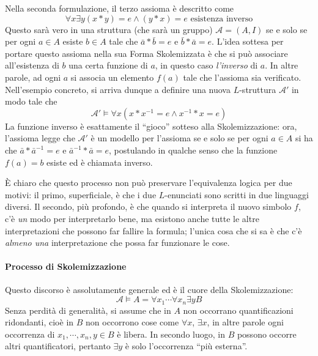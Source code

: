 Nella seconda formulazione, il terzo assioma è descritto come 
$$
\forall x \exists y (x * y) = e \land (y * x) = e \text{ esistenza inverso}
$$
Questo sarà vero in una struttura (che sarà un gruppo) $\mathcal{A} = (A,I)$ se e 
solo se per ogni $a \in A$ esiste $b \in A$ tale che $\bar{a} * \bar{b} = e$ 
e $\bar{b} * \bar{a} = e$. L'idea sottesa per portare questo assioma 
nella sua Forma Skolemizzata è che si può associare all'esistenza di $b$ una 
certa funzione di $a$, in questo caso \textit{l'inverso} di $a$. In altre 
parole, ad ogni $a$ si associa un elemento $f(a)$ tale che l'assioma sia verificato. 
Nell'esempio concreto, si arriva dunque a definire una nuova $L$-struttura $\mathcal{A}'$
in modo tale che 
$$
\mathcal{A}' \models \forall x (x*x^{-1} = e \land x^{-1} * x = e)
$$
La funzione inverso è esattamente il ``gioco'' sotteso alla Skolemizzazione: 
ora, l'assioma legge che $\mathcal{A}'$ è un modello per l'assioma 
se e solo se per ogni $a \in A$ si ha che $\bar{a} * \bar{a}^{-1} = e$ 
e $\bar{a}^{-1} * \bar{a} = e$, postulando in qualche senso che  la funzione
$f(a) = b$ esiste ed è chiamata inverso. 

\`E chiaro che questo processo non può preservare l'equivalenza logica per 
due motivi: il primo, superficiale, è che i due $L$-enunciati 
sono scritti in due linguaggi diversi. Il secondo, più profondo, è che 
quando si interpreta il nuovo simbolo $f$, c'è \textit{un} modo per interpretarlo 
bene, ma esistono anche tutte le altre interpretazioni che possono 
far fallire la formula; l'unica cosa che si sa è che c'è \textit{almeno una}
interpretazione che possa far funzionare le cose. 

\paragraph{Processo di Skolemizzazione}
Questo discorso è assolutamente generale ed è il cuore della Skolemizzazione: 
$$
\mathcal{A} \models A =  \forall x_1\cdots\forall x_n \exists y B
$$
Senza perdità di generalità, si assume che in $A$ non occorrano quantificazioni 
ridondanti, cioè in $B$ non occorrono cose come $\forall x$, $\exists x$, in
altre parole ogni occorrenza di $x_1, \cdots, x_n, y \in B$ è libera.
In secondo luogo, in $B$ possono occorre altri quantificatori, pertanto 
$\exists y$ è solo l'occorrenza ``più esterna''. 

